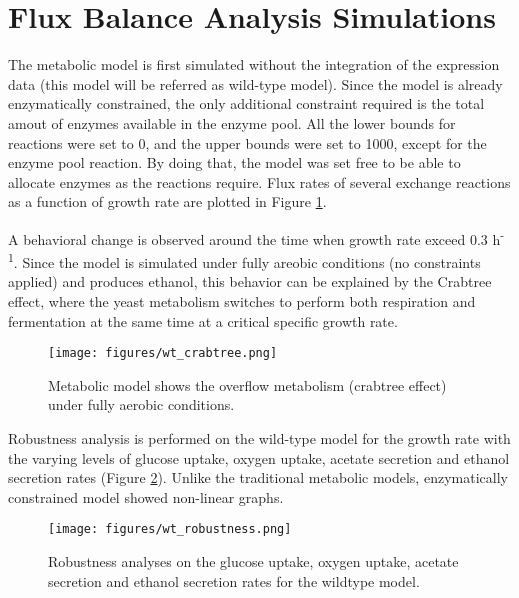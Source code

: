 \section{Flux Balance Analysis Simulations}

The metabolic model is first simulated without the integration of the expression data (this model will be referred as wild-type model). Since the model is already enzymatically constrained, the only additional constraint required is the total amout of enzymes available in the enzyme pool. All the lower bounds for reactions were set to 0, and the upper bounds were set to 1000, except for the enzyme pool reaction. By doing that, the model was set free to be able to allocate enzymes as the reactions require. Flux rates of several exchange reactions as a function of growth rate are plotted in Figure \ref{fig:wt_crabtree}.

A behavioral change is observed around the time when growth rate exceed 0.3 h\textsuperscript{-1}. Since the model is simulated under fully areobic conditions (no constraints applied) and produces ethanol, this behavior can be explained by the Crabtree effect, where the yeast metabolism switches to perform both respiration and fermentation at the same time at a critical specific growth rate.

\begin{figure}[H]
  \begin{center}
  \texttt{[image: figures/wt\_crabtree.png]}
  \caption[Metabolic model shows the overflow metabolism]{Metabolic model shows the overflow metabolism (crabtree effect) under fully aerobic conditions.}
  \label{fig:wt_crabtree}
  \end{center}
\end{figure}

Robustness analysis is performed on the wild-type model for the growth rate with the varying levels of glucose uptake, oxygen uptake, acetate secretion and ethanol secretion rates (Figure \ref{fig:wt_robustness}). Unlike the traditional metabolic models, enzymatically constrained model showed non-linear graphs.

\begin{figure}[H]
  \begin{center}
  \texttt{[image: figures/wt\_robustness.png]}
  \caption[Robustness analyses on the glucose uptake, oxygen uptake, acetate secretion and ethanol secretion rates for the wildtype model]{Robustness analyses on the glucose uptake, oxygen uptake, acetate secretion and ethanol secretion rates for the wildtype model.}
  \label{fig:wt_robustness}
  \end{center}
\end{figure}

